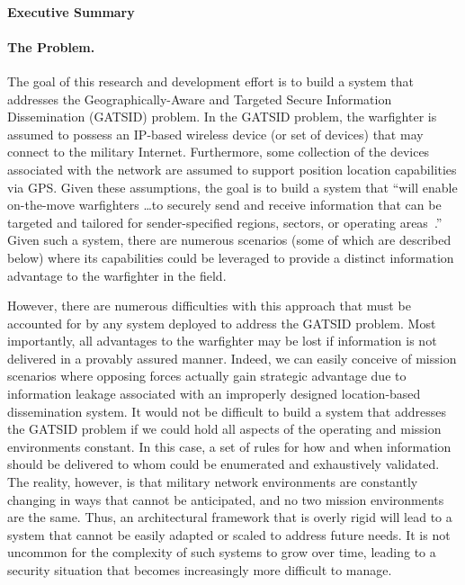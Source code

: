 \documentclass{sbir}
\begin{document}
\paragraph{Executive Summary}
\paragraph{The Problem.} The goal of this research and development effort is to build a system that addresses the Geographically-Aware and Targeted Secure Information Dissemination (GATSID) problem.  In the GATSID problem, the warfighter is assumed to possess an IP-based wireless device (or set of devices) that may connect to the military Internet. Furthermore, some collection of the devices associated with the network are assumed to support position location capabilities via GPS. Given these assumptions, the goal is to build a system that ``will enable on-the-move warfighters \ldots to securely send and receive information that can be targeted and tailored for sender-specified regions, sectors, or operating areas~\cite{AF131-039}.''  Given such a system, there are numerous scenarios (some of which are described below) where its capabilities could be leveraged to provide a distinct information advantage to the warfighter in the field. 

However, there are numerous difficulties with this approach that must be accounted for by any system deployed to address the GATSID problem.  Most importantly, all advantages to the warfighter may be lost if information is not delivered in a provably assured manner. Indeed, we can easily conceive of mission scenarios where opposing forces actually gain strategic advantage due to information leakage associated with an improperly designed location-based dissemination system.  It would not be difficult to build a system that addresses the GATSID problem if we could hold all aspects of the operating and mission environments constant. In this case, a set of rules for how and when information should be delivered to whom could be enumerated and exhaustively validated.  The reality, however, is that military network environments are constantly changing in ways that cannot be anticipated, and no two mission environments are the same.  Thus, an architectural framework that is overly rigid will lead to a system that cannot be easily adapted or scaled to address future needs.  It is not uncommon for the complexity of such systems to grow over time, leading to a security situation that becomes increasingly more difficult to manage.
\end{document}
